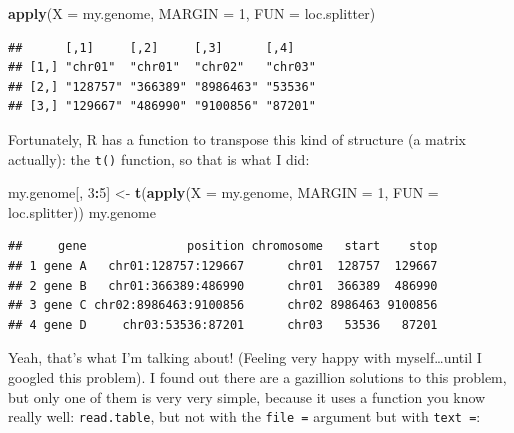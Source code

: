 \documentclass[]{book}
\newenvironment{Shaded}{\begin{snugshade}}{\end{snugshade}}
\newcommand{\DataTypeTok}[1]{\textcolor[rgb]{0.13,0.29,0.53}{#1}}
\newcommand{\DecValTok}[1]{\textcolor[rgb]{0.00,0.00,0.81}{#1}}
\newcommand{\KeywordTok}[1]{\textcolor[rgb]{0.13,0.29,0.53}{\textbf{#1}}}
\newcommand{\NormalTok}[1]{#1}
\newcommand{\OperatorTok}[1]{\textcolor[rgb]{0.81,0.36,0.00}{\textbf{#1}}}
\newcommand{\StringTok}[1]{\textcolor[rgb]{0.31,0.60,0.02}{#1}}
\begin{document}
\begin{Shaded}
\begin{Highlighting}[]
\KeywordTok{apply}\NormalTok{(}\DataTypeTok{X =}\NormalTok{ my.genome,}
      \DataTypeTok{MARGIN =} \DecValTok{1}\NormalTok{,}
      \DataTypeTok{FUN =}\NormalTok{ loc.splitter)}
\end{Highlighting}
\end{Shaded}

\begin{verbatim}
##      [,1]     [,2]     [,3]      [,4]   
## [1,] "chr01"  "chr01"  "chr02"   "chr03"
## [2,] "128757" "366389" "8986463" "53536"
## [3,] "129667" "486990" "9100856" "87201"
\end{verbatim}

Fortunately, R has a function to transpose this kind of structure (a matrix actually): the \texttt{t()} function, so that is what I did:

\begin{Shaded}
\begin{Highlighting}[]
\NormalTok{my.genome[, }\DecValTok{3}\OperatorTok{:}\DecValTok{5}\NormalTok{] <-}\StringTok{ }\KeywordTok{t}\NormalTok{(}\KeywordTok{apply}\NormalTok{(}\DataTypeTok{X =}\NormalTok{ my.genome,}
                            \DataTypeTok{MARGIN =} \DecValTok{1}\NormalTok{,}
                            \DataTypeTok{FUN =}\NormalTok{ loc.splitter))}
\NormalTok{my.genome}
\end{Highlighting}
\end{Shaded}

\begin{verbatim}
##     gene              position chromosome   start    stop
## 1 gene A   chr01:128757:129667      chr01  128757  129667
## 2 gene B   chr01:366389:486990      chr01  366389  486990
## 3 gene C chr02:8986463:9100856      chr02 8986463 9100856
## 4 gene D     chr03:53536:87201      chr03   53536   87201
\end{verbatim}

Yeah, that's what I'm talking about! (Feeling very happy with myself\ldots{}until I googled this problem). I found out there are a gazillion solutions to this problem, but only one of them is very very simple, because it uses a function you know really well: \texttt{read.table}, but not with the \texttt{file\ =} argument but with \texttt{text\ =}:
\end{document}
